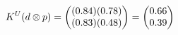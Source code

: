 \documentclass[preview]{standalone}
\begin{document}
\begin{align*}
\special{dvisvgm:raw <g id='unique000'>}K^U(d \otimes p) = \begin{pmatrix} (0.84)(0.78) \\ (0.83)(0.48) \end{pmatrix} = \begin{pmatrix} 0.66 \\ 0.39 \end{pmatrix}\special{dvisvgm:raw </g>}
\end{align*}
\end{document}
